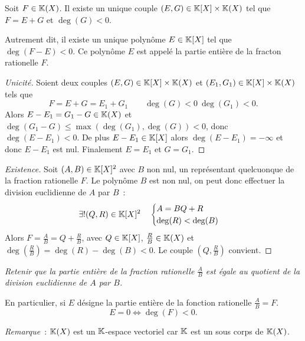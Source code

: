 \begin{theo}
  Soit $F \in \mathbb{K}(X)$. Il existe un unique couple $(E,G) \in \mathbb{K}[X]\times\mathbb{K}(X)$ tel que $F=E+G$ et $\deg(G)<0$.

  Autrement dit, il existe un unique polynôme $E \in \mathbb{K}[X]$ tel que $\deg(F-E)<0$. Ce polynôme $E$ est appelé la partie entière de la fracton rationelle $F$.
\end{theo}
\begin{proof}[Unicité]
  Soient deux couples $(E,G) \in \mathbb{K}[X]\times\mathbb{K}(X)$ et $(E_1,G_1) \in \mathbb{K}[X]\times\mathbb{K}(X)$ tels que
  \begin{equation}
    F=E+G=E_1+G_1 \qquad \deg(G)<0 \ \deg(G_1)<0.
  \end{equation}
  Alors $E-E_1=G_1-G \in \mathbb{K}(X)$ et $\deg(G_1-G)\leqslant \max(\deg(G_1),\deg(G))<0$, donc $\deg(E-E_1)<0$. De plus $E-E_1 \in \mathbb{K}[X]$ alors $\deg(E-E_1)=-\infty$ et donc $E-E_1$ est nul. Finalement $E=E_1$ et $G=G_1$.
\end{proof}
\begin{proof}[Existence]
  Soit $(A,B) \in \mathbb{K}[X]^2$ avec $B$ non nul, un représentant quelcuonque de la fraction rationelle $F$. Le polynôme $B$ est non nul, on peut donc effectuer la division euclidienne de $A$ par $B$~:
  \begin{equation}
    \exists! (Q,R) \in \mathbb{K}[X]^2 \quad \begin{cases} A=BQ+R \\ \deg(R) < \deg(B) \end{cases}
  \end{equation}
  Alors $F=\frac{A}{B}=Q+\frac{R}{B}$, avec $Q \in \mathbb{K}[X]$, $\frac{R}{B} \in \mathbb{K}(X)$ et $\deg\left(\frac{R}{B}\right)=\deg(R)-\deg(B)<0$. Le couple $(Q,\frac{R}{B})$ convient.
\end{proof}

\emph{Retenir que la partie entière de la fraction rationelle $\frac{A}{B}$ est égale au quotient de la division euclidienne de $A$ par $B$.}

En particulier, si $E$ désigne la partie entière de la fonction rationelle $\frac{A}{B}=F$.
\begin{equation}
  E=0 \iff \deg(F) <0.
\end{equation}

\emph{Remarque}~: $\mathbb{K}(X)$ est un $\mathbb{K}$-espace vectoriel car $\mathbb{K}$ est un sous corps de $\mathbb{K}(X)$.

